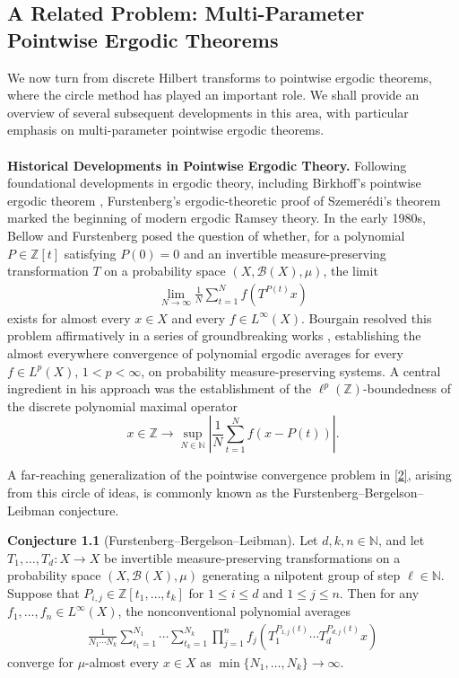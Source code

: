 \documentclass[11 pt,letterpaper]{amsart}
\theoremstyle{plain}
\theoremstyle{definition}
\theoremstyle{remark} \theoremstyle{exam} \theoremstyle{ob}
\numberwithin{equation}{section}
\begin{document}
\subsection{A Related Problem: Multi-Parameter Pointwise Ergodic Theorems}We now  turn from discrete Hilbert transforms to pointwise ergodic theorems, where the circle method has played an important role.
We shall provide an overview of several subsequent developments in this area, with particular emphasis on multi-parameter pointwise ergodic theorems.\\\\
\noindent \textbf{Historical Developments in Pointwise Ergodic Theory.}  
Following foundational developments in ergodic theory, including Birkhoff's pointwise ergodic theorem \cite{Bi}, Furstenberg's ergodic-theoretic proof of Szemerédi's theorem \cite{F0,Sz} marked the beginning of modern ergodic Ramsey theory.
 In the early 1980s, Bellow \cite{Bel} and Furstenberg \cite{F1} posed the question of whether, for a polynomial $P \in \mathbb{Z}[t]$ satisfying $P(0)=0$ and an invertible measure-preserving transformation $T$ on a probability space $(X,\mathcal{B}(X),\mu)$, the limit \begin{align}\label{2}
	\lim_{N \to \infty}\frac{1}{N}\sum_{t=1}^{N} f(T^{P(t)}x)
\end{align}
exists for almost every $x \in X$ and every $f \in L^\infty(X)$.   
Bourgain resolved this problem affirmatively in a series of groundbreaking works \cite{B1,B2,B3}, establishing the almost everywhere convergence of polynomial ergodic averages for every $f\in L^p(X)$, $1<p<\infty$, on probability measure-preserving systems. A central ingredient in his approach was the establishment of the $\ell^p(\mathbb{Z})$-boundedness of the discrete polynomial maximal operator
$$x\in\mathbb{Z}\rightarrow\sup_{N\in \mathbb{N}}\left|\frac{1}{N}\sum_{t=1}^{N} f(x-P(t))\right|.$$

 A far-reaching generalization of the
pointwise convergence problem in \eqref{2}, arising from this circle of
ideas, is commonly known as the Furstenberg--Bergelson--Leibman conjecture.

\medskip
\noindent
\textbf{Conjecture 1.1} (Furstenberg--Bergelson--Leibman).  
Let $d,k,n \in \mathbb{N}$, and let $T_1,\dots,T_d : X \to X$ be invertible measure-preserving transformations on a probability space $(X,\mathcal{B}(X),\mu)$ generating a nilpotent group of step $\ell \in \mathbb{N}$. Suppose that
$P_{i,j} \in \mathbb{Z}[t_1,\dots,t_k]$ for $ 1 \le i \le d$ and  $1 \le j \le n.$
Then for any $f_1,\dots,f_n \in L^\infty(X)$, the nonconventional polynomial averages
\begin{align}\label{o1}
	\frac{1}{N_1\cdots N_k}
	\sum_{t_1=1}^{N_1}\cdots\sum_{t_k=1}^{N_k}
	\prod_{j=1}^n
	f_j\left(
	T_1^{P_{1,j}(t)} \cdots T_d^{P_{d,j}(t)} x
	\right)
\end{align}
converge for $\mu$-almost every $x \in X$ as $\min\{N_1,\dots,N_k\}\to\infty$.
\end{document}
